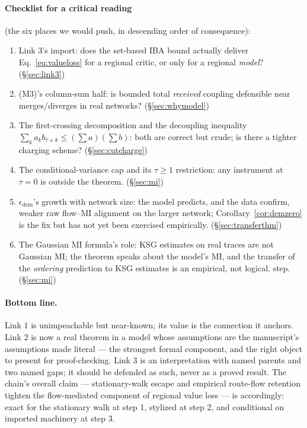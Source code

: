 \documentclass[11pt]{article}
\theoremstyle{definition}
\theoremstyle{remark}
\begin{document}
\paragraph{Checklist for a critical reading} (the six places we would push,
in descending order of consequence):
\begin{enumerate}
    \item Link 3's import: does the set-based IBA bound actually deliver
          Eq.~\eqref{eq:valueloss} for a regional critic, or only for a
          regional \emph{model}? (\S\ref{sec:link3})
    \item (M3)'s column-sum half: is bounded total \emph{received} coupling
          defensible near merges/diverges in real networks?
          (\S\ref{sec:whymodel})
    \item The first-crossing decomposition and the decoupling inequality
          $\sum_k a_k b_{\tau+k} \leq (\sum a)(\sum b)$: both are correct but
          crude; is there a tighter charging scheme? (\S\ref{sec:cutcharge})
    \item The conditional-variance cap and its $\tau \geq 1$ restriction:
          any instrument at $\tau = 0$ is outside the theorem.
          (\S\ref{sec:mi})
    \item $\epsilon_{\mathrm{dem}}$'s growth with network size: the model
          predicts, and the data confirm, weaker raw flow--MI alignment on
          the larger network; Corollary~\ref{cor:demzero} is the fix but has
          not yet been exercised empirically. (\S\ref{sec:transferthm})
    \item The Gaussian MI formula's role: KSG estimates on real traces are
          not Gaussian MI; the theorem speaks about the model's MI, and the
          transfer of the \emph{ordering} prediction to KSG estimates is an
          empirical, not logical, step. (\S\ref{sec:mi})
\end{enumerate}

\paragraph{Bottom line.}
Link 1 is unimpeachable but near-known; its value is the connection it
anchors.
Link 2 is now a real theorem in a model whose assumptions are the
manuscript's assumptions made literal --- the strongest formal component, and
the right object to present for proof-checking.
Link 3 is an interpretation with named parents and two named gaps; it should
be defended as such, never as a proved result.
The chain's overall claim --- stationary-walk escape and empirical route-flow
retention tighten the flow-mediated component of regional value loss --- is
accordingly: exact for the stationary walk at step 1, stylized at step 2,
and conditional on imported machinery at step 3.

    {\small
        
        
    }
\end{document}
